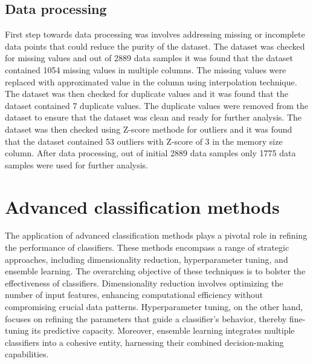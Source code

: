 \documentclass[conference,onecolumn]{IEEEtran}
\begin{document}

\subsection{Data processing}
    First step towards data processing was involves addressing missing or incomplete data points that could reduce the purity of the dataset. The dataset was checked for missing values and out of 2889 data samples it was found that the dataset contained 1054 missing values in multiple columns. The missing values were replaced with approximated value in the column using interpolation technique. The dataset was then checked for duplicate values and it was found that the dataset contained 7 duplicate values. The duplicate values were removed from the dataset to ensure that the dataset was clean and ready for further analysis. The dataset was then checked using Z-score methode for outliers and it was found that the dataset contained 53 outliers with Z-score of 3 in the memory size column.
    After data processing, out of initial 2889 data samples only 1775 data samples were used for further analysis.




\section{Advanced classification methods}
    The application of advanced classification methods plays a pivotal role in refining the performance of classifiers. These methods encompass a range of strategic approaches, including dimensionality reduction, hyperparameter tuning, and ensemble learning. The overarching objective of these techniques is to bolster the effectiveness of classifiers. Dimensionality reduction involves optimizing the number of input features, enhancing computational efficiency without compromising crucial data patterns. Hyperparameter tuning, on the other hand, focuses on refining the parameters that guide a classifier's behavior, thereby fine-tuning its predictive capacity. Moreover, ensemble learning integrates multiple classifiers into a cohesive entity, harnessing their combined decision-making capabilities.
\end{document}
